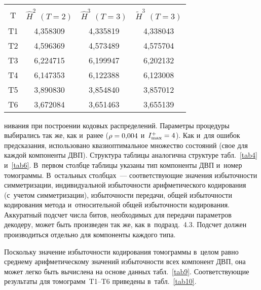 \begin{multicols}{2}
{\begin{center}
\tabcolsep=10pt
\begin{tabular}{|c|c|c|c|}
\hline
&&&\\[-9pt]
T  & $\hat{H}^2$ $(T=2)$ & $\hat{H}^3$ $(T=3)$ &  $\tilde{H}^3$ $(T=3)$\\
\hline
T1 & 4,358309 & 4,335819 & 4,338043 \\
T2 & 4,596369 & 4,573489 & 4,575704 \\
T3 & 6,224715 & 6,199947 & 6,202132 \\
T4 & 6,147353 & 6,122388 & 6,123008 \\
T5 & 3,890830 & 3,854840 & 3,857012 \\
T6 & 3,672084 & 3,651463 & 3,655139 \\
\hline
\end{tabular}
\end{center}
\vspace*{16pt}
}



\noindent
нивания при построении кодовых распределений. Параметры процедуры 
выбирались так же, как и~ранее ($\rho\hm= 0{,}004$ и~$I_{\max}^+\hm=4$). 
Как и~для ошибок предсказания, использовано квазиоптимальное множество 
состояний (свое для каждой компоненты ДВП). Структура таблицы аналогична 
структу\-ре табл.~\ref{tab4} и~\ref{tab6}. В~первом столбце таблицы указаны 
тип компоненты ДВП и~номер томограммы. В~остальных столбцах~--- 
соответствующие значения из\-бы\-точ\-ности симметризации, индивидуальной из\-бы\-точ\-ности 
арифметического кодирования (с~учетом симметризации), избыточности передачи, общей 
избыточности кодирования метода и~относительной общей избыточности кодирования. 
Аккуратный подсчет числа битов, необходимых для передачи параметров декодеру, 
может быть произведен так же, как 
в~подразд.~4.3. Подсчет должен производиться отдельно для компоненты каждого типа.




Поскольку значение избыточности кодирования томограммы в~целом равно 
среднему арифметическому значений избыточности всех компонент ДВП, 
она может легко быть вычислена на основе данных табл.~\ref{tab9}. 
Соответствующие результаты для томограмм~T1--T6 приведены в~табл.~\ref{tab10}.

\begin{table*}[b]\small
\vspace*{-9pt}
\begin{center}
\label{tab11}
\vspace{2ex}


\end{center}
\end{table*}
\end{multicols}
